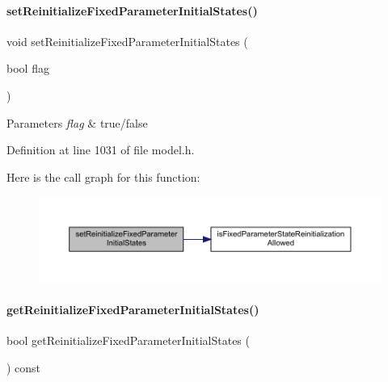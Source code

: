 \paragraph{\texorpdfstring{set\+Reinitialize\+Fixed\+Parameter\+Initial\+States()}{setReinitializeFixedParameterInitialStates()}}
{\footnotesize\ttfamily void set\+Reinitialize\+Fixed\+Parameter\+Initial\+States (\begin{DoxyParamCaption}\item[{bool}]{flag }\end{DoxyParamCaption})}


\begin{DoxyParams}{Parameters}
{\em flag} & true/false \\
\hline
\end{DoxyParams}


Definition at line 1031 of file model.\+h.

Here is the call graph for this function\+:
\nopagebreak
\begin{figure}[H]
\begin{center}
\leavevmode
\includegraphics[width=350pt]{classamici_1_1_model_aaf26e3d4c8b574bc7e63f8beea677bcb_cgraph}
\end{center}
\end{figure}
\mbox{\label{classamici_1_1_model_a09f372616ff7bf8073c732801b666f7e}} 
\paragraph{\texorpdfstring{get\+Reinitialize\+Fixed\+Parameter\+Initial\+States()}{getReinitializeFixedParameterInitialStates()}}
{\footnotesize\ttfamily bool get\+Reinitialize\+Fixed\+Parameter\+Initial\+States (\begin{DoxyParamCaption}{ }\end{DoxyParamCaption}) const}

